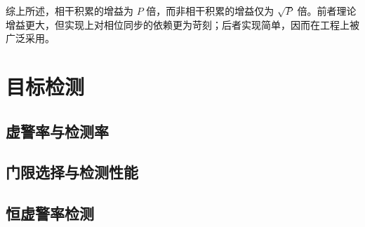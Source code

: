 综上所述，相干积累的增益为 \( P \) 倍，而非相干积累的增益仅为 \(\sqrt{P}\) 倍。前者理论增益更大，但实现上对相位同步的依赖更为苛刻；后者实现简单，因而在工程上被广泛采用。

\section{目标检测}
\subsection{虚警率与检测率}
\subsection{门限选择与检测性能}
\subsection{恒虚警率检测}

